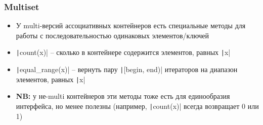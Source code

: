 \documentclass[10pt]{beamer}
\begin{document}
\begin{frame}[fragile]
\frametitle{Multiset}
\begin{itemize}
\item У multi-версий ассоциативных контейнеров есть специальные методы для работы с последовательностью одинаковых элементов/ключей
\pause
\item \texttt|count(x)| -- сколько в контейнере содержится элементов, равных \texttt|x|
\pause
\item \texttt|equal_range(x)| -- вернуть пару \texttt|[begin, end)| итераторов на диапазон элементов, равных \texttt|x|
\pause
\item \textbf{NB:} у не-multi контейнеров эти методы тоже есть для единообразия интерфейса, но менее полезны (например, \texttt|count(x)| всегда возвращает 0 или 1)
\end{itemize}
\end{frame}
\end{document}
